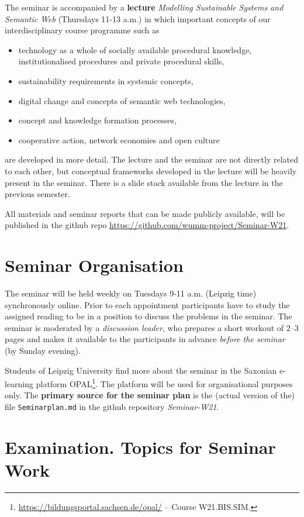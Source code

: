 \documentclass[11pt,a4paper]{article}
\begin{document}
The seminar is accompanied by a \textbf{lecture} \emph{Modelling Sustainable
  Systems and Semantic Web} (Thursdays 11-13 a.m.) in which important concepts
of our interdisciplinary course programme such as
\begin{itemize}[noitemsep]
\item technology as a whole of socially available procedural knowledge,
  institutionalised procedures and private procedural skills, 
\item sustainability requirements in systemic concepts,
\item digital change and concepts of semantic web technologies,
\item concept and knowledge formation processes,
\item cooperative action, network economies and open culture
\end{itemize}
are developed in more detail. The lecture and the seminar are not directly
related to each other, but conceptual frameworks developed in the lecture will
be heavily present in the seminar. There is a slide stack \cite{Graebe2021}
available from the lecture in the previous semester.

All materials and seminar reports that can be made publicly available, will be
published in the github repo
\url{https://github.com/wumm-project/Seminar-W21}.

\section{Seminar Organisation}

The seminar will be held weekly on Tuesdays 9-11 a.m. (Leipzig time)
synchronously online.  Prior to each appointment participants have to study
the assigned reading to be in a position to discuss the problems in the
seminar.  The seminar is moderated by a \emph{discussion leader}, who prepares
a short workout of 2--3 pages and makes it available to the participants in
advance \emph{before the seminar} (by Sunday evening).

Students of Leipzig University find more about the seminar in the Saxonian
e-learning platform
OPAL\footnote{\url{https://bildungsportal.sachsen.de/opal/} -- Course
  W21.BIS.SIM.}.  The platform will be used for organisational purposes only.
The \textbf{primary source for the seminar plan} is the (actual version of
the) file \texttt{Seminarplan.md} in the github repository \emph{Seminar-W21}.

\section{Examination. Topics for Seminar Work}
\end{document}
